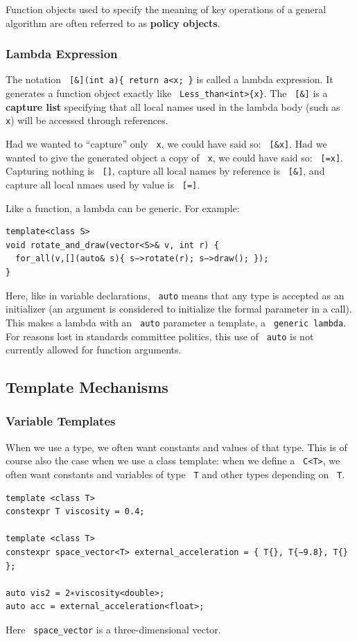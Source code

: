 \documentclass[11pt]{article}
\let\OldTexttt\texttt
\renewcommand{\texttt}[1]{\OldTexttt{\color{MidnightBlue} #1}}
\begin{document}
Function objects used to specify the meaning of key operations of a general algorithm are often
referred to as \textbf{policy objects}.
\subsubsection{Lambda Expression}
\label{sec:orgd2af52a}
The notation \texttt{[\&](int a)\{ return a<x; \}} is called a lambda expression. It generates a function
object exactly like \texttt{Less\_than<int>\{x\}}. The \texttt{[\&]} is a \textbf{capture list} specifying that all local names
used in the lambda body (such as \texttt{x}) will be accessed through references.

Had we wanted to ``capture'' only \texttt{x}, we could have said so: \texttt{[\&x]}. Had we wanted to give the
generated object a copy of \texttt{x}, we could have said so: \texttt{[=x]}. Capturing nothing is \texttt{[]}, capture all
local names by reference is \texttt{[\&]}, and capture all local nmaes used by value is \texttt{[=]}.

Like a function, a lambda can be generic. For example:
\begin{verbatim}
template<class S>
void rotate_and_draw(vector<S>& v, int r) {
  for_all(v,[](auto& s){ s−>rotate(r); s−>draw(); });
}
\end{verbatim}
Here, like in variable declarations, \texttt{auto} means that any type is accepted as an initializer (an
argument is considered to initialize the formal parameter in a call). This makes a lambda with
an \texttt{auto} parameter a template, a \texttt{generic lambda}. For reasons lost in standards committee
politics, this use of \texttt{auto} is not currently allowed for function arguments.
\subsection{Template Mechanisms}
\label{sec:org3465024}
\subsubsection{Variable Templates}
\label{sec:orga98b4c8}
When we use a type, we often want constants and values of that type. This is of course also the
case when we use a class template: when we define a \texttt{C<T>}, we often want constants and variables
of type \texttt{T} and other types depending on \texttt{T}.

\begin{verbatim}
template <class T>
constexpr T viscosity = 0.4;

template <class T>
constexpr space_vector<T> external_acceleration = { T{}, T{−9.8}, T{} };

auto vis2 = 2∗viscosity<double>;
auto acc = external_acceleration<float>;
\end{verbatim}
Here \texttt{space\_vector} is a three-dimensional vector.
\end{document}
